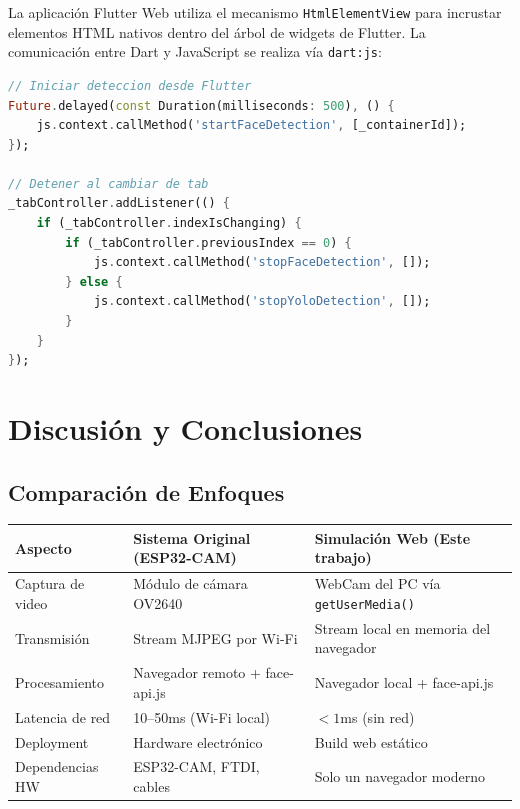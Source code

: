 \documentclass[12pt,a4paper]{article}
\begin{document}
La aplicación Flutter Web utiliza el mecanismo \texttt{HtmlElementView} para incrustar elementos HTML nativos dentro del árbol de widgets de Flutter. La comunicación entre Dart y JavaScript se realiza vía \texttt{dart:js}:

\begin{lstlisting}[language=Dart, caption={Llamada de Dart a JavaScript (main.dart)}]
// Iniciar deteccion desde Flutter
Future.delayed(const Duration(milliseconds: 500), () {
    js.context.callMethod('startFaceDetection', [_containerId]);
});

// Detener al cambiar de tab
_tabController.addListener(() {
    if (_tabController.indexIsChanging) {
        if (_tabController.previousIndex == 0) {
            js.context.callMethod('stopFaceDetection', []);
        } else {
            js.context.callMethod('stopYoloDetection', []);
        }
    }
});
\end{lstlisting}

\section{Discusión y Conclusiones}

\subsection{Comparación de Enfoques}

\begin{longtable}{p{3.5cm} p{5cm} p{5cm}}
  \toprule
  \textbf{Aspecto} & \textbf{Sistema Original (ESP32-CAM)} & \textbf{Simulación Web (Este trabajo)} \\
  \midrule
  \endfirsthead
  Captura de video & Módulo de cámara OV2640 & WebCam del PC vía \texttt{getUserMedia()} \\[4pt]
  Transmisión & Stream MJPEG por Wi-Fi & Stream local en memoria del navegador \\[4pt]
  Procesamiento & Navegador remoto + face-api.js & Navegador local + face-api.js \\[4pt]
  Latencia de red & 10--50ms (Wi-Fi local) & $< 1$ms (sin red) \\[4pt]
  Deployment & Hardware electrónico & Build web estático \\[4pt]
  Dependencias HW & ESP32-CAM, FTDI, cables & Solo un navegador moderno \\
  \bottomrule
\end{longtable}
\end{document}
